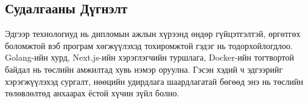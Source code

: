\subsection{Судалгааны Дүгнэлт}
Эдгээр технологиуд нь дипломын ажлын хүрээнд өндөр гүйцэтгэлтэй, өргөтгөх боломжтой вэб програм хөгжүүлэхэд тохиромжтой гэдэг нь тодорхойлогдлоо. Golang-ийн хурд, Next.js-ийн хэрэглэгчийн туршлага, Docker-ийн тогтвортой байдал нь төслийн амжилтад хувь нэмэр оруулна. Гэсэн хэдий ч эдгээрийг хэрэгжүүлэхэд сургалт, нөөцийн удирдлага шаардлагатай бөгөөд энэ нь төслийн төлөвлөлтөд анхаарах ёстой хүчин зүйл болно.
